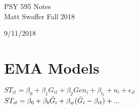 \documentclass[12 pt]{article}
\begin{document}
\begin{center}
	PSY 595 Notes\\
	\color{blue}
	Matt Swaffer Fall 2018
	\color{black}
\end{center}

\begin{center}
    9/11/2018
\end{center}
\section{EMA Models}
$ST_{it} = \beta_0 + \beta_1 G_{it} + \beta_2 Gen_i + \beta_{t_t} + u_i + \epsilon_{it}$\\
$ST_{it} = \beta_0 + \beta_b \Bar{G}_i + \beta_w(\Bar{G}_i - \beta_{it}) + ...$
\end{document}
